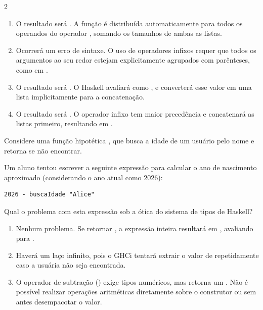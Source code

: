 \documentclass[a4paper,10pt,brazil]{article}
\begin{document}
\begin{multicols}{2}
\begin{enumerate}
  \item O resultado será . A função  é distribuída automaticamente para todos os operandos do operador \haskellinline{++}, somando os tamanhos de ambas as listas.

  \item Ocorrerá um erro de sintaxe. O uso de operadores infixos requer que todos os argumentos ao seu redor estejam explicitamente agrupados com parênteses, como em .

  \item O resultado será \haskellinline{[3, 4, 5]}. O Haskell avaliará  como , e converterá esse valor em uma lista implicitamente para a concatenação.

  \item O resultado será . O operador infixo \haskellinline{++} tem maior precedência e concatenará as listas primeiro, resultando em .


\end{enumerate}

Considere uma função hipotética , que busca a idade de um usuário pelo nome e retorna  se não encontrar. 

Um aluno tentou escrever a seguinte expressão para calcular o ano de nascimento aproximado (considerando o ano atual como 2026):
\begin{verbatim}
2026 - buscaIdade "Alice"
\end{verbatim}

Qual o problema com esta expressão sob a ótica do sistema de tipos de Haskell?

\begin{enumerate}
  \item Nenhum problema. Se  retornar , a expressão inteira resultará em , avaliando para .

  \item Haverá um laço infinito, pois o GHCi tentará extrair o valor de  repetidamente caso a usuária não seja encontrada.

  \item O operador de subtração (\haskellinline{-}) exige tipos numéricos, mas  retorna um . Não é possível realizar operações aritméticas diretamente sobre o construtor  ou  sem antes desempacotar o valor.


\end{enumerate}
\end{multicols}
\end{document}
